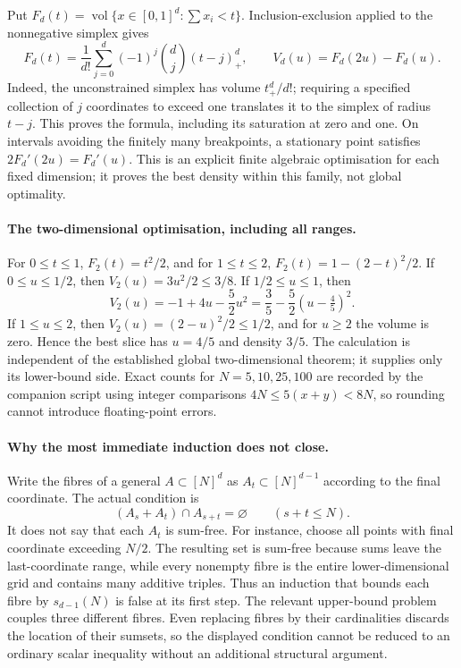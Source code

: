 \documentclass[11pt,a4paper]{article}
\begin{document}
Put $F_d(t)=\operatorname{vol}\{x\in[0,1]^d:\sum x_i<t\}$. Inclusion-exclusion applied to the nonnegative simplex gives
\[
 F_d(t)=\frac1{d!}\sum_{j=0}^d(-1)^j\binom dj(t-j)_+^d,
 \qquad V_d(u)=F_d(2u)-F_d(u).
\]
Indeed, the unconstrained simplex has volume $t_+^d/d!$; requiring a specified collection of $j$ coordinates to exceed one translates it to the simplex of radius $t-j$. This proves the formula, including its saturation at zero and one. On intervals avoiding the finitely many breakpoints, a stationary point satisfies $2F_d'(2u)=F_d'(u)$. This is an explicit finite algebraic optimisation for each fixed dimension; it proves the best density within this family, not global optimality.

\paragraph{The two-dimensional optimisation, including all ranges.}
For $0\leq t\leq1$, $F_2(t)=t^2/2$, and for $1\leq t\leq2$, $F_2(t)=1-(2-t)^2/2$. If $0\leq u\leq1/2$, then $V_2(u)=3u^2/2\leq3/8$. If $1/2\leq u\leq1$, then
\[
 V_2(u)=-1+4u-\frac52u^2
       =\frac35-\frac52(u-\tfrac45)^2.
\]
If $1\leq u\leq2$, then $V_2(u)=(2-u)^2/2\leq1/2$, and for $u\geq2$ the volume is zero. Hence the best slice has $u=4/5$ and density $3/5$. The calculation is independent of the established global two-dimensional theorem; it supplies only its lower-bound side. Exact counts for $N=5,10,25,100$ are recorded by the companion script using integer comparisons $4N\leq5(x+y)<8N$, so rounding cannot introduce floating-point errors.

\paragraph{Why the most immediate induction does not close.}
Write the fibres of a general $A\subset[N]^d$ as $A_t\subset[N]^{d-1}$ according to the final coordinate. The actual condition is
\[
 (A_s+A_t)\cap A_{s+t}=\varnothing\qquad(s+t\leq N).
\]
It does not say that each $A_t$ is sum-free. For instance, choose all points with final coordinate exceeding $N/2$. The resulting set is sum-free because sums leave the last-coordinate range, while every nonempty fibre is the entire lower-dimensional grid and contains many additive triples. Thus an induction that bounds each fibre by $s_{d-1}(N)$ is false at its first step. The relevant upper-bound problem couples three different fibres. Even replacing fibres by their cardinalities discards the location of their sumsets, so the displayed condition cannot be reduced to an ordinary scalar inequality without an additional structural argument.
\end{document}

